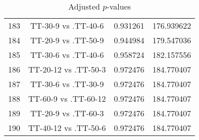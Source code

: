 \documentclass[a4paper,10pt]{article}
\begin{document}
\begin{landscape}
\begin{table}[!htp]
\begin{tabular}{cccc}
183&TT-30-9 vs .TT-40-6&0.931261&176.939622\\
184&TT-20-9 vs .TT-50-9&0.944984&179.547036\\
185&TT-30-6 vs .TT-40-6&0.958724&182.157556\\
186&TT-20-12 vs .TT-50-3&0.972476&184.770407\\
187&TT-30-6 vs .TT-30-9&0.972476&184.770407\\
188&TT-60-9 vs .TT-60-12&0.972476&184.770407\\
189&TT-20-9 vs .TT-60-3&0.972476&184.770407\\
190&TT-40-12 vs .TT-50-6&0.972476&184.770407\\
\hline
\end{tabular}
\caption{Adjusted $p$-values}
\end{table}

\end{landscape}
\end{document}
